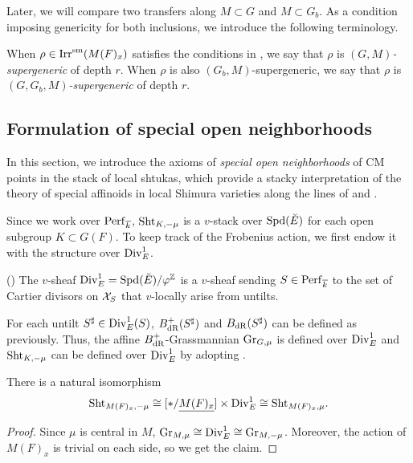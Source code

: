 \documentclass[12pt,reqno]{amsart}
\begin{document}
Later, we will compare two transfers along $M \subset G$ and $M \subset G_b$. As a condition imposing genericity for both inclusions, we introduce the following terminology. 

\begin{defi} \label{defi:supergeneric_representation}
    When $\rho \in {\operatorname{Irr}}^{\operatorname{sm}}(M(F)_x)$ satisfies the conditions in , we say that $\rho$ is \textit{$(G, M)$-supergeneric} of depth $r$. When $\rho$ is also $(G_b, M)$-supergeneric, we say that $\rho$ is \textit{$(G, G_b, M)$-supergeneric} of depth $r$. 
\end{defi}


\subsection{Formulation of special open neighborhoods} \label{ssec:formulation_special_open}

In this section, we introduce the axioms of \textit{special open neighborhoods} of CM points in the stack of local shtukas, which provide a stacky interpretation of the theory of special affinoids in local Shimura varieties along the lines of \cite{Yos10} and \cite{BW16}. 

Since we work over ${\operatorname{Perf}}_{{\overline{k}}}$, ${\operatorname{Sht}}_{K, -\mu}$ is a $v$-stack over ${\operatorname{Spd}}(\breve{E})$ for each open subgroup $K \subset G(F)$. To keep track of the Frobenius action, we first endow it with the structure over ${\operatorname{Div}}_E^1$. 

\begin{defi}\textup{(\cite[Definition II.1.19]{FS24})}
    The $v$-sheaf ${\operatorname{Div}}^1_E = {\operatorname{Spd}}(\breve{E}) / \varphi^{\mathbb{Z}}$ is a $v$-sheaf sending $S \in {\operatorname{Perf}}_{{\overline{k}}}$ to the set of Cartier divisors on ${\mathcal{X}}_S$ that $v$-locally arise from untilts. 
\end{defi}

For each untilt $S^\sharp \in {\operatorname{Div}}^1_E(S)$, $B^+_{\operatorname{dR}}(S^\sharp)$ and $B_{\operatorname{dR}}(S^\sharp)$ can be defined as previously. Thus, the affine $B^+_{\operatorname{dR}}$-Grassmannian ${\operatorname{Gr}}_{G, \mu}$ is defined over ${\operatorname{Div}}^1_E$ and ${\operatorname{Sht}}_{K, -\mu}$ can be defined over ${\operatorname{Div}}^1_E$ by adopting . 

\begin{lem}
    There is a natural isomorphism 
    \[  
        {\operatorname{Sht}}_{M(F)_x, -\mu} \cong [\ast / {\underline{M(F)_x}}] \times {\operatorname{Div}}^1_E \cong {\operatorname{Sht}}_{M(F)_x, \mu}. 
    \]
\end{lem}
\begin{proof}
    Since $\mu$ is central in $M$, ${\operatorname{Gr}}_{M, \mu} \cong {\operatorname{Div}}^1_E \cong {\operatorname{Gr}}_{M, -\mu}$. Moreover, the action of $M(F)_x$ is trivial on each side, so we get the claim. 
\end{proof}
\end{document}
